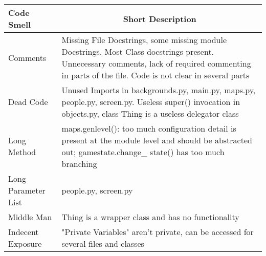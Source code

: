 \documentclass[11pt,a4paper]{article}
\begin{document}
	\begin{table}[H]
		\centering
		\begin{tabular}{p{4cm}p{11cm}}
			\toprule
			\textbf{Code Smell} & \multicolumn{1}{c}{\textbf{Short Description}}\\ \midrule
			Comments & Missing File Docstrings, some missing module Docstrings. Most Class docstrings
						present. Unnecessary comments, lack of required commenting in
						parts of the file. Code is not clear in several parts \\
			Dead Code & Unused Imports in backgrounds.py, main.py, maps.py, people.py, screen.py.
						Useless super() invocation in objects.py, class Thing is a useless
						delegator class\\
			Long Method & maps.genlevel(): too much configuration detail is present at the module level
						and should be abstracted out; gamestate.change\_ state() has too much branching\\ 
			Long Parameter List &  people.py, screen.py \\
			Middle Man & Thing is a wrapper class and has no functionality \\ 
			Indecent Exposure & "Private Variables" aren't private, can be accessed 
								for several files and classes\\  \bottomrule
		\end{tabular}
	\end{table}
	
\end{document}
